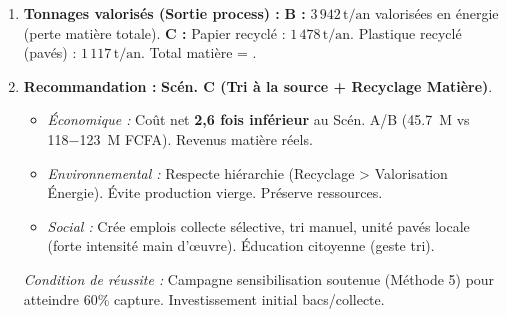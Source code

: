\documentclass[11pt]{article}
\begin{document}
\begin{exoresolu}
\begin{enumerate}
    \textbf{Scén. C (Tri source + Recyclage Matière) :}
    \textit{Papier :} Capté = $7,5 \times 365 \times 0,60 = 1\,642,5\,\text{t/an}$. Trié (90\%) = $1\,478\,\text{t/an}$. Revenu = $1\,478 \times 40\,000 = 59\,120\,000$.
    \textit{Plastique :} Capté = $6,0 \times 365 \times 0,60 = 1\,314\,\text{t/an}$. Trié (85\%) = $1\,117\,\text{t/an}$. Coût net = $1\,117 \times 10\,000 = 11\,170\,000$ (charge).
    \textit{Restes (non captés + refus tri) :} $4\,927,5 - (1\,642,5+1\,314) = 1\,971\,\text{t/an}$ enfouis ($1\,971 \times 25\,000 = 49\,275\,000$).
    \textit{Coût collecte sélective (supplément) :} Estimation \SI{15 000}{FCFA/t} capté $\rightarrow (1\,642,5+1\,314) \times 15\,000 = 44\,347\,500$.
    \textbf{Total Scén C :} $49,275 + 44,347 + 11,170 - 59,120 = \boxed{45\,672\,500\,\text{FCFA/an}}$.
    
    \item \textbf{Tonnages valorisés (Sortie process) :}
    \textbf{B :} $3\,942\,\text{t/an}$ valorisées en énergie (perte matière totale).
    \textbf{C :} Papier recyclé : $1\,478\,\text{t/an}$. Plastique recyclé (pavés) : $1\,117\,\text{t/an}$. Total matière = .
    
    \item \textbf{Recommandation :} \textbf{Scén. C (Tri à la source + Recyclage Matière)}.
    \begin{itemize}
        \item \textit{Économique :} Coût net \textbf{2,6 fois inférieur} au Scén. A/B (\SI{45,7}{M} vs \SI{118-123}{M} FCFA). Revenus matière réels.
        \item \textit{Environnemental :} Respecte hiérarchie (Recyclage > Valorisation Énergie). Évite  production vierge. Préserve ressources.
        \item \textit{Social :} Crée emplois collecte sélective, tri manuel, unité pavés locale (forte intensité main d'œuvre). Éducation citoyenne (geste tri).
    \end{itemize}
    \textit{Condition de réussite :} Campagne sensibilisation soutenue (Méthode 5) pour atteindre 60\% capture. Investissement initial bacs/collecte.
\end{enumerate}
\end{exoresolu}
\end{document}
